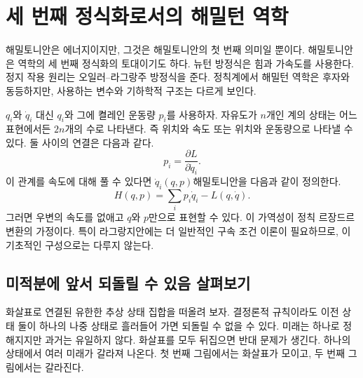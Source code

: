 \begin{classroomqa}
\end{classroomqa}

\section{세 번째 정식화로서의 해밀턴 역학}

해밀토니안은 에너지이지만, 그것은 해밀토니안의 첫 번째 의미일 뿐이다. 해밀토니안은 역학의 세 번째 정식화의 토대이기도 하다. 뉴턴 방정식은 힘과 가속도를 사용한다. 정지 작용 원리는 오일러--라그랑주 방정식을 준다. 정칙계에서 해밀턴 역학은 후자와 동등하지만, 사용하는 변수와 기하학적 구조는 다르게 보인다.

\(q_i\)와 \(\dot q_i\) 대신 \(q_i\)와 그에 켤레인 운동량 \(p_i\)를 사용하자. 자유도가 \(n\)개인 계의 상태는 어느 표현에서든 \(2n\)개의 수로 나타낸다. 즉 위치와 속도 또는 위치와 운동량으로 나타낼 수 있다. 둘 사이의 연결은 다음과 같다.
\begin{equation}
  p_i=\frac{\partial L}{\partial\dot q_i}.
  \label{eq:l6-legendre-map}
\end{equation}
이 관계를 속도에 대해 풀 수 있다면
\(\dot q_i(q,p)\)해밀토니안을 다음과 같이 정의한다.
\begin{equation}
  H(q,p)=\sum_i p_i\dot q_i-L(q,\dot q).
  \label{eq:l6-hamiltonian-definition}
\end{equation}
그러면 우변의 속도를 없애고 \(q\)와 \(p\)만으로 표현할 수 있다. 이 가역성이 정칙 르장드르 변환의 가정이다. 특이 라그랑지안에는 더 일반적인 구속 조건 이론이 필요하므로, 이 기초적인 구성으로는 다루지 않는다.

\subsection{미적분에 앞서 되돌릴 수 있음 살펴보기}

화살표로 연결된 유한한 추상 상태 집합을 떠올려 보자. 결정론적 규칙이라도 이전 상태 둘이 하나의 나중 상태로 흘러들어 가면 되돌릴 수 없을 수 있다. 미래는 하나로 정해지지만 과거는 유일하지 않다. 화살표를 모두 뒤집으면 반대 문제가 생긴다. 하나의 상태에서 여러 미래가 갈라져 나온다. 첫 번째 그림에서는 화살표가 모이고, 두 번째 그림에서는 갈라진다.

